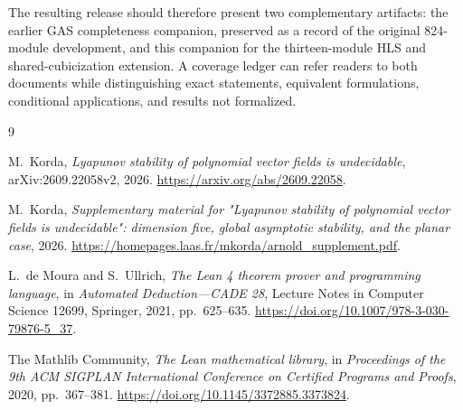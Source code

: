 \documentclass[11pt]{article}
\begin{document}
The resulting release should therefore present two complementary artifacts:
the earlier GAS completeness companion, preserved as a record of the original
824-module development, and this companion for the thirteen-module HLS and
shared-cubicization extension.  A coverage ledger can refer readers to both
documents while distinguishing exact statements, equivalent formulations,
conditional applications, and results not formalized.

\begin{thebibliography}{9}

M.~Korda,
\emph{Lyapunov stability of polynomial vector fields is undecidable},
arXiv:2609.22058v2, 2026.
\url{https://arxiv.org/abs/2609.22058}.

M.~Korda,
\emph{Supplementary material for "Lyapunov stability of polynomial vector
fields is undecidable": dimension five, global asymptotic stability, and the
planar case}, 2026.
\url{https://homepages.laas.fr/mkorda/arnold_supplement.pdf}.

L.~de Moura and S.~Ullrich,
\emph{The Lean 4 theorem prover and programming language},
in \emph{Automated Deduction---CADE 28}, Lecture Notes in Computer Science
12699, Springer, 2021, pp.~625--635.
\url{https://doi.org/10.1007/978-3-030-79876-5_37}.

The Mathlib Community,
\emph{The Lean mathematical library},
in \emph{Proceedings of the 9th ACM SIGPLAN International Conference on
Certified Programs and Proofs}, 2020, pp.~367--381.
\url{https://doi.org/10.1145/3372885.3373824}.

\end{thebibliography}
\end{document}
